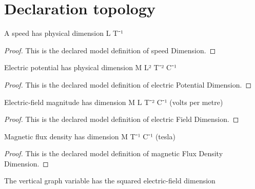 \section{Declaration topology}
\begin{definition}
  \label{def:physics:phyx-mini-0955:phyxminiproblems-problemphyxmini0955-speeddimension}
  A speed has physical dimension L T⁻¹
\end{definition}
\begin{proof}
  This is the declared model definition of speed Dimension.
\end{proof}
\begin{definition}
  \label{def:physics:phyx-mini-0955:phyxminiproblems-problemphyxmini0955-electricpotentialdimension}
  Electric potential has physical dimension M L² T⁻² C⁻¹
\end{definition}
\begin{proof}
  This is the declared model definition of electric Potential Dimension.
\end{proof}
\begin{definition}
  \label{def:physics:phyx-mini-0955:phyxminiproblems-problemphyxmini0955-electricfielddimension}
  Electric-field magnitude has dimension M L T⁻² C⁻¹ (volts per metre)
\end{definition}
\begin{proof}
  This is the declared model definition of electric Field Dimension.
\end{proof}
\begin{definition}
  \label{def:physics:phyx-mini-0955:phyxminiproblems-problemphyxmini0955-magneticfluxdensitydimension}
  Magnetic flux density has dimension M T⁻¹ C⁻¹ (tesla)
\end{definition}
\begin{proof}
  This is the declared model definition of magnetic Flux Density Dimension.
\end{proof}
\begin{definition}
  \label{def:physics:phyx-mini-0955:phyxminiproblems-problemphyxmini0955-electricfieldsquareddimension}
  The vertical graph variable has the squared electric-field dimension
\end{definition}

